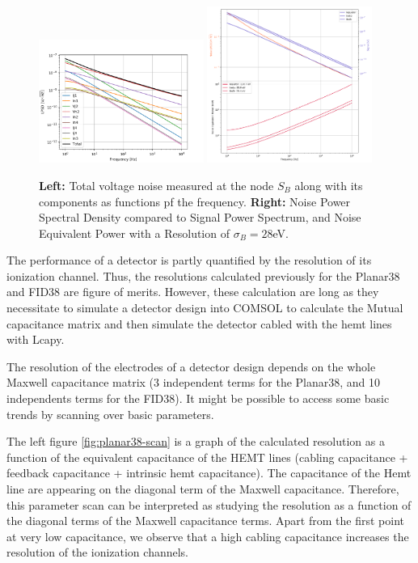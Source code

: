\begin{figure}
\centering
\includegraphics[width=0.48\textwidth]{Figures/Electrodes/fid38_noise_propagation.png}
\includegraphics[width=0.48\textwidth]{Figures/Electrodes/fid38_nep_resolution.png}
\caption{
\textbf{Left:} Total voltage noise measured at the node $S_B$ along with its components as functions pf the frequency.
\textbf{Right:} Noise Power Spectral Density compared to Signal Power Spectrum, and Noise Equivalent Power with a Resolution of $\sigma_{B} = 28$eV.
}
\label{fig:fid38-propagation}
\end{figure}

The performance of a detector is partly quantified by the resolution of its ionization channel. Thus, the resolutions calculated previously for the Planar38 and FID38 are figure of merits. However, these calculation are long as they necessitate to simulate a detector design into COMSOL to calculate the Mutual capacitance matrix and then simulate the detector cabled with the hemt lines with Lcapy.

The resolution of the electrodes of a detector design depends on the whole Maxwell capacitance matrix (3 independent terms for the Planar38, and 10 independents terms for the FID38). It might be possible to access some basic trends by scanning over basic parameters.

The left figure \ref{fig:planar38-scan} is a graph of the calculated resolution as a function of the equivalent capacitance of the HEMT lines (cabling capacitance + feedback capacitance + intrinsic hemt capacitance). The capacitance of the Hemt line are appearing on the diagonal term of the Maxwell capacitance. Therefore, this parameter scan can be interpreted as studying the resolution as a function of the diagonal terms of the Maxwell capacitance terms.
Apart from the first point at very low capacitance, we observe that a high cabling capacitance increases the resolution of the ionization channels.

